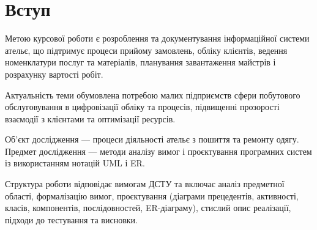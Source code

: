 \section{Вступ}
Метою курсової роботи є розроблення та документування інформаційної системи ательє, що підтримує процеси прийому замовлень, обліку клієнтів, ведення номенклатури послуг та матеріалів, планування завантаження майстрів і розрахунку вартості робіт.

Актуальність теми обумовлена потребою малих підприємств сфери побутового обслуговування в цифровізації обліку та процесів, підвищенні прозорості взаємодії з клієнтами та оптимізації ресурсів.

Об'єкт дослідження — процеси діяльності ательє з пошиття та ремонту одягу. Предмет дослідження — методи аналізу вимог і проєктування програмних систем із використанням нотацій UML і ER.

Структура роботи відповідає вимогам ДСТУ та включає аналіз предметної області, формалізацію вимог, проєктування (діаграми прецедентів, активності, класів, компонентів, послідовностей, ER-діаграму), стислий опис реалізації, підходи до тестування та висновки.
